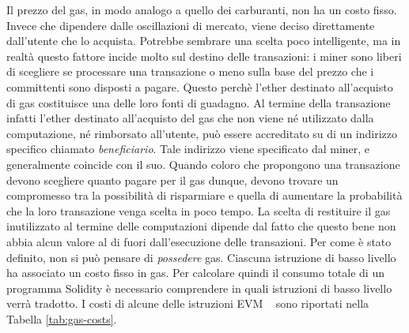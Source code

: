 \indent Il prezzo del gas, in modo analogo a quello dei carburanti, non ha un costo fisso. Invece che dipendere dalle oscillazioni di mercato, viene deciso direttamente dall'utente che lo acquista.
Potrebbe sembrare una scelta poco intelligente, ma in realtà questo fattore incide molto sul destino delle transazioni: i miner sono liberi di scegliere se processare una transazione o meno sulla base del prezzo che i committenti sono disposti a pagare. Questo perchè l'ether destinato all'acquisto di gas costituisce una delle loro fonti di guadagno. Al termine della transazione infatti l'ether destinato all'acquisto del gas che non viene né utilizzato dalla computazione, né rimborsato all'utente, può essere accreditato su di un indirizzo specifico chiamato \textit{beneficiario}. Tale indirizzo viene specificato dal miner, e generalmente coincide con il suo. Quando coloro che propongono una transazione devono scegliere quanto pagare per il gas dunque, devono trovare un compromesso tra la possibilità di risparmiare e quella di aumentare la probabilità che la loro transazione venga scelta in poco tempo.\newline
\indent La scelta di restituire il gas inutilizzato al termine delle computazioni dipende dal fatto che questo bene non abbia alcun valore al di fuori dall'esecuzione delle transazioni. Per come è stato definito, non si può pensare di \textit{possedere} gas.\newline
\indent Ciascuna istruzione di basso livello ha associato un costo fisso in gas. Per calcolare quindi il consumo totale di un programma Solidity è necessario comprendere in quali istruzioni di basso livello verrà tradotto. I costi di alcune delle istruzioni EVM ~\cite{wood2014ethereum} sono riportati nella Tabella \ref{tab:gas-costs}.

